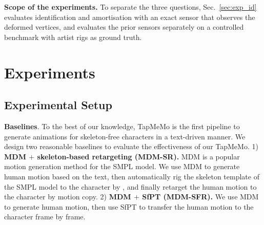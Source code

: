 \documentclass[lettersize,journal]{IEEEtran}
\newenvironment{revblock}{\par\color{red}}{\par}
\begin{document}
\begin{revblock}
\textbf{Scope of the experiments.} To separate the three questions, Sec.~\ref{sec:exp_id} evaluates
identification and amortisation with an exact sensor that observes the deformed vertices, and
evaluates the prior sensors separately on a controlled benchmark with artist rigs as ground truth.
\end{revblock}

\section{Experiments} \label{sec:exp}

\subsection{Experimental Setup}

\textbf{Baselines}. To the best of our knowledge, TapMeMo is the first pipeline to generate animations for skeleton-free characters in a text-driven manner. We design two reasonable baselines to evaluate the effectiveness of our TapMeMo. 1) \textbf{MDM $+$ skeleton-based retargeting (MDM-SR).} MDM \cite{tevet2022human} is a popular motion generation method for the SMPL model. We use MDM to generate human motion based on the text, then automatically rig the skeleton template of the SMPL model to the character by \cite{baran2007automatic}, and finally retarget the human motion to the character by motion copy. 2) \textbf{MDM $+$ SfPT (MDM-SFR).} We use MDM to generate human motion, then use SfPT \cite{liao2022skeleton} to transfer the human motion to the character frame by frame.
\end{document}
